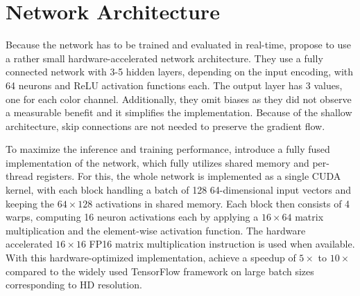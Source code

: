 \section{Network Architecture}
\label{sec:fully_fused}
Because the network has to be trained and evaluated in real-time, \textcite{muller2021,muller2022} propose to use a rather small hardware-accelerated network architecture.
They use a fully connected network with 3-5 hidden layers, depending on the input encoding, with 64 neurons and ReLU activation functions each.
The output layer has 3 values, one for each color channel.
Additionally, they omit biases as they did not observe a measurable benefit and it simplifies the implementation.
Because of the shallow architecture, skip connections are not needed to preserve the gradient flow.

To maximize the inference and training performance, \textcite{muller2021} introduce a fully fused implementation of the network, which fully utilizes shared memory and per-thread registers.
For this, the whole network is implemented as a single CUDA kernel, with each block handling a batch of 128 64-dimensional input vectors and keeping the $64\times128$ activations in shared memory.
Each block then consists of 4 warps, computing 16 neuron activations each by applying a $16\times64$ matrix multiplication and the element-wise activation function.
The hardware accelerated $16\times16$ FP16 matrix multiplication instruction is used when available.
With this hardware-optimized implementation, \textcite{muller2021} achieve a speedup of $5\times$ to $10\times$ compared to the widely used TensorFlow framework \parencite{tensorflowdevelopers2021} on large batch sizes corresponding to HD resolution.

